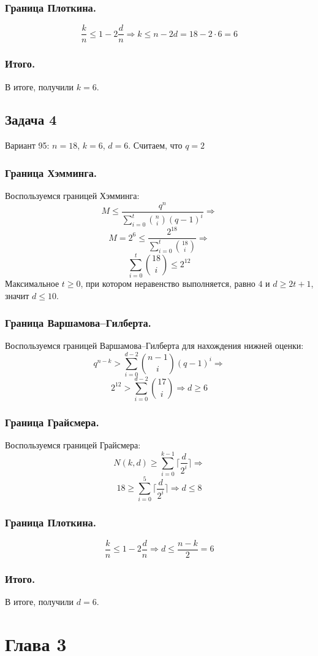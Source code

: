 \documentclass{article}
\begin{document}
\subsubsection{Граница Плоткина.}
$$\frac{k}{n} \leq 1 - 2\frac{d}{n} \Rightarrow k \leq n - 2d = 18 - 2 \cdot 6 = 6$$
%
\subsubsection{Итого.}
В итоге, получили $k = 6$.
%
\subsection{Задача 4}
%
Вариант 95: $n=18$, $k=6$, $d=6$. Считаем, что $q=2$
%
\subsubsection{Граница Хэмминга.}
%
Воспользуемся границей Хэмминга:
$$M \leq \frac{q^{n}}{\sum^{t}_{i=0}\binom{n}{i}(q-1)^{i}} \Rightarrow$$
$$M = 2^{6} \leq \frac{2^{18}}{\sum^{t}_{i=0}\binom{18}{i}} \Rightarrow$$
$$\sum^{t}_{i=0}\binom{18}{i} \leq 2^{12}$$
Максимальное $t \geq 0$, при котором неравенство выполняется, равно $4$ и $d \geq 2t + 1$, значит $d \leq 10$.
%
\subsubsection{Граница Варшамова–Гилберта.}
%
Воспользуемся границей Варшамова–Гилберта для нахождения нижней оценки:
$$q^{n-k} > \sum_{i=0}^{d - 2}\binom{n - 1}{i} (q - 1)^{i} \Rightarrow$$
$$2^{12} > \sum_{i=0}^{d-2}\binom{17}{i} \Rightarrow d \geq 6$$
%
\subsubsection{Граница Грайсмера.}
%
Воспользуемся границей Грайсмера:
$$N(k,d) \geq \sum_{i=0}^{k-1} \Big\lceil \frac{d}{2^{i}} \Big\rceil \Rightarrow$$
$$18 \geq \sum_{i=0}^{5}\Big\lceil \frac{d}{2^{i}} \Big\rceil \Rightarrow d \leq 8$$
%
\subsubsection{Граница Плоткина.}
$$\frac{k}{n} \leq 1 - 2\frac{d}{n} \Rightarrow d \leq \frac{n - k}{2} = 6$$
%
\subsubsection{Итого.}
%
В итоге, получили $d = 6$.
%
\section{Глава 3}
\end{document}
